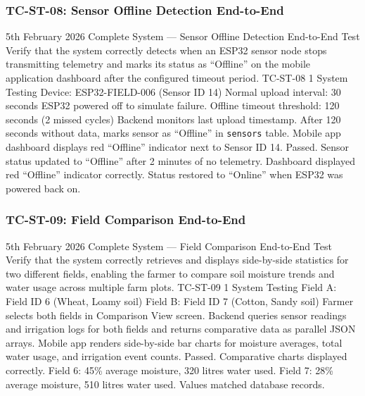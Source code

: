 \subsubsection{TC-ST-08: Sensor Offline Detection End-to-End}

\testcase%
{5th February 2026}%
{Complete System --- Sensor Offline Detection End-to-End
Test}%
{Verify that the system correctly detects when an ESP32
sensor node stops transmitting telemetry and marks its
status as ``Offline'' on the mobile application dashboard
after the configured timeout period.}%
{TC-ST-08}%
{1}%
{System Testing}%
{Device: ESP32-FIELD-006 (Sensor ID 14) \newline
Normal upload interval: 30 seconds \newline
ESP32 powered off to simulate failure. \newline
Offline timeout threshold: 120 seconds (2 missed cycles)}%
{Backend monitors last upload timestamp. After 120 seconds
without data, marks sensor as ``Offline'' in
\texttt{sensors} table. Mobile app dashboard displays red
``Offline'' indicator next to Sensor ID 14.}%
{Passed. Sensor status updated to ``Offline'' after 2
minutes of no telemetry. Dashboard displayed red
``Offline'' indicator correctly. Status restored to
``Online'' when ESP32 was powered back on.}

\subsubsection{TC-ST-09: Field Comparison End-to-End}

\testcase%
{5th February 2026}%
{Complete System --- Field Comparison End-to-End Test}%
{Verify that the system correctly retrieves and displays
side-by-side statistics for two different fields, enabling
the farmer to compare soil moisture trends and water usage
across multiple farm plots.}%
{TC-ST-09}%
{1}%
{System Testing}%
{Field A: Field ID 6 (Wheat, Loamy soil) \newline
Field B: Field ID 7 (Cotton, Sandy soil) \newline
Farmer selects both fields in Comparison View screen.}%
{Backend queries sensor readings and irrigation logs for
both fields and returns comparative data as parallel JSON
arrays. Mobile app renders side-by-side bar charts for
moisture averages, total water usage, and irrigation event
counts.}%
{Passed. Comparative charts displayed correctly. Field 6:
45\% average moisture, 320 litres water used. Field 7:
28\% average moisture, 510 litres water used. Values
matched database records.}

